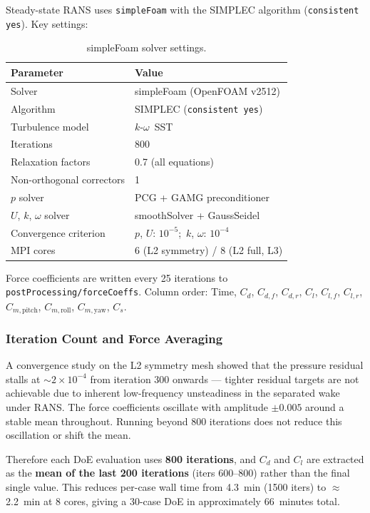 Steady-state RANS uses \texttt{simpleFoam} with the SIMPLEC algorithm (\texttt{consistent yes}). Key settings:

\begin{table}[h]
    \centering
    \caption{simpleFoam solver settings.}
    \label{tab:solver_settings}
    \begin{tabular}{ll}
        \toprule
        Parameter & Value \\
        \midrule
        Solver & simpleFoam (OpenFOAM v2512) \\
        Algorithm & SIMPLEC (\texttt{consistent yes}) \\
        Turbulence model & $k$-$\omega$~SST \\
        Iterations & 800 \\
        Relaxation factors & 0.7 (all equations) \\
        Non-orthogonal correctors & 1 \\
        $p$ solver & PCG + GAMG preconditioner \\
        $U$, $k$, $\omega$ solver & smoothSolver + GaussSeidel \\
        Convergence criterion & $p$, $U$: $10^{-5}$;\ $k$, $\omega$: $10^{-4}$ \\
        MPI cores & 6 (L2 symmetry) / 8 (L2 full, L3) \\
        \bottomrule
    \end{tabular}
\end{table}

Force coefficients are written every 25 iterations to \texttt{postProcessing/forceCoeffs}. Column order: Time, $C_d$, $C_{d,f}$, $C_{d,r}$, $C_l$, $C_{l,f}$, $C_{l,r}$, $C_{m,\mathrm{pitch}}$, $C_{m,\mathrm{roll}}$, $C_{m,\mathrm{yaw}}$, $C_s$.

\subsubsection{Iteration Count and Force Averaging}

A convergence study on the L2 symmetry mesh showed that the pressure residual stalls at $\sim 2 \times 10^{-4}$ from iteration 300 onwards — tighter residual targets are not achievable due to inherent low-frequency unsteadiness in the separated wake under RANS. The force coefficients oscillate with amplitude $\pm 0.005$ around a stable mean throughout. Running beyond 800 iterations does not reduce this oscillation or shift the mean.

Therefore each DoE evaluation uses \textbf{800 iterations}, and $C_d$ and $C_l$ are extracted as the \textbf{mean of the last 200 iterations} (iters 600--800) rather than the final single value. This reduces per-case wall time from 4.3~min (1500 iters) to $\approx$2.2~min at 8 cores, giving a 30-case DoE in approximately 66~minutes total.

